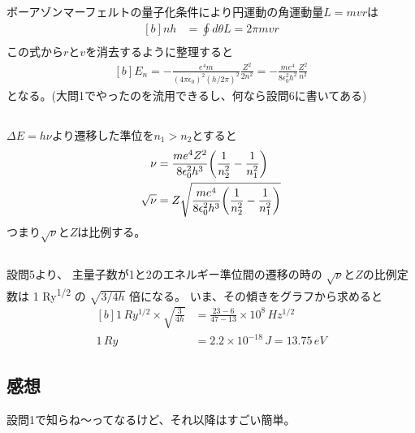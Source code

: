 \documentclass[../../sp_2013.tex]{subfiles}
\begin{document}
\subsection{}
ボーアゾンマーフェルトの量子化条件により円運動の角運動量\(L=mvr\)は
\begin{equation}\begin{aligned}[b]
    nh &= \oint d\theta L = 2\pi mvr\\
\end{aligned}\end{equation}
この式から\(r\)と\(v\)を消去するように整理すると
\begin{equation}\begin{aligned}[b]
    E_n = -\frac{e^4m}{(4\pi\epsilon_0)^2(h/2\pi)^2}\frac{Z^2}{2n^2}
    = -\frac{me^4}{8\epsilon_0^2h^2}\frac{Z^2}{n^2}
\end{aligned}\end{equation}
となる。(大問1でやったのを流用できるし、何なら設問6に書いてある)

\subsection{}
\(\Delta E=h\nu\)より遷移した準位を\(n_1>n_2\)とすると
\begin{equation}\begin{aligned}[b]
    \nu &= \frac{me^4Z^2}{8\epsilon_0^2h^3}\qty(\frac{1}{n_2^2}-\frac{1}{n_1^2})\\
    \sqrt{\nu} &= Z\sqrt{\frac{me^4}{8\epsilon_0^2h^3}\qty(\frac{1}{n_2^2}-\frac{1}{n_1^2})}
\end{aligned}\end{equation}
つまり\(\sqrt{\nu}\)と\(Z\)は比例する。

\subsection{}
設問5より、
主量子数が1と2のエネルギー準位間の遷移の時の
\(\sqrt{\nu}\)と\(Z\)の比例定数は 1 \si{Ry^{1/2}} の \(\sqrt{3/4h}\) 倍になる。
いま、その傾きをグラフから求めると
\begin{equation}\begin{aligned}[b]
    1\,\si{Ry^{1/2}}\times \sqrt{\frac{3}{4h}} &= \frac{23-6}{47-13} \times 10^8 \,\si{Hz^{1/2}}\\
    1 \,\si{Ry} &= 2.2\times10^{-18} \,\si{J} = 13.75 \,\si{eV}
\end{aligned}\end{equation}

\subsection{}


\subsection*{感想}
設問1で知らね～ってなるけど、それ以降はすごい簡単。
\end{document}

